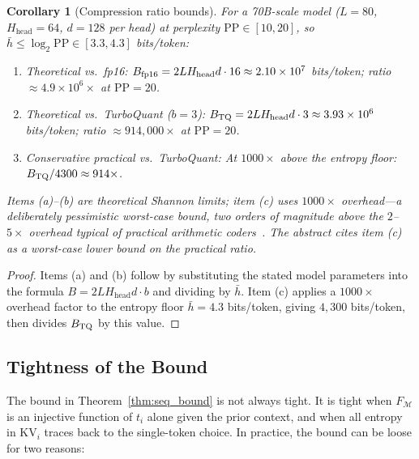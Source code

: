 \documentclass[11pt]{article}
\newtheorem{corollary}{Corollary}
\begin{document}
\begin{corollary}[Compression ratio bounds]
\label{cor:ratio}
For a 70B-scale model ($L=80$, $H_{\mathrm{head}}=64$, $d=128$ per head) at perplexity
$\mathrm{PP} \in [10,20]$, so $\bar{h} \leq \log_2\mathrm{PP} \in [3.3, 4.3]$ bits/token:
\begin{enumerate}[leftmargin=2em,label=(\alph*)]
  \item \emph{Theoretical vs.\ fp16:}
        $B_{\rm fp16} = 2LH_{\mathrm{head}}d \cdot 16 \approx 2.10 \times 10^7$ bits/token;
        ratio $\approx 4.9 \times 10^6\times$ at $\mathrm{PP}=20$.
  \item \emph{Theoretical vs.\ TurboQuant ($b=3$):}
        $B_{\rm TQ} = 2LH_{\mathrm{head}}d \cdot 3 \approx 3.93 \times 10^6$ bits/token;
        ratio $\approx 914{,}000\times$ at $\mathrm{PP}=20$.
  \item \emph{Conservative practical vs.\ TurboQuant:}
        At $1000\times$ above the entropy floor:
        $B_{\rm TQ}/4300 \approx 914\times$.
\end{enumerate}
Items (a)--(b) are theoretical Shannon limits; item (c) uses $1000\times$
overhead---a deliberately pessimistic worst-case bound, two orders of magnitude
above the $2$--$5\times$ overhead typical of practical arithmetic
coders~\cite{witten1987,cover2006}.  The abstract cites item (c) as a
worst-case lower bound on the practical ratio.
\end{corollary}

\begin{proof}
Items (a) and (b) follow by substituting the stated model parameters into the
formula $B = 2LH_{\mathrm{head}}d \cdot b$ and dividing by $\bar{h}$.  Item (c) applies a
$1000\times$ overhead factor to the entropy floor $\bar{h} = 4.3$ bits/token,
giving $4{,}300$ bits/token, then divides $B_{\rm TQ}$ by this value.
\end{proof}

\subsection{Tightness of the Bound}

The bound in Theorem~\ref{thm:seq_bound} is not always tight.  It is tight when
$F_{\mathcal{M}}$ is an injective function of $t_i$ alone given the prior context,
and when all entropy in $\mathrm{KV}_i$ traces back to the single-token choice.
In practice, the bound can be loose for two reasons:
\end{document}
